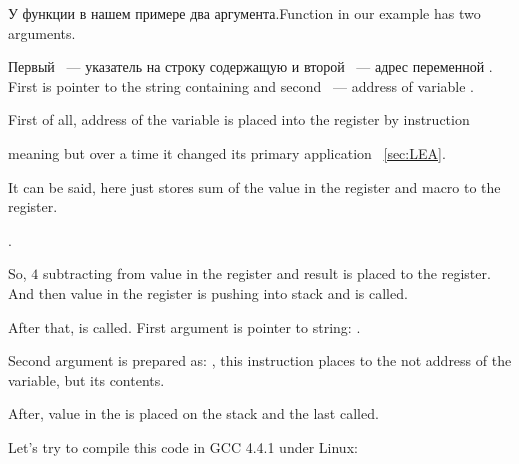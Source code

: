 \IFRU
{У функции \scanf в нашем примере два аргумента.}{Function \scanf in our example has two arguments.}

\IFRU
{Первый ~--- указатель на строку содержащую  и второй ~--- адрес переменной .} 
{First is pointer to the string containing  and second ~--- address of variable .} 

{First of all, address of the  variable is placed into the \EAX register by  instruction}

{\LEA meaning  but over a time it changed its primary application}
~\ref{sec:LEA}.

{It can be said, \LEA here just stores sum of the value in the \EBP register and  macro to the \EAX register.}

 .

{So, $4$ subtracting from value in the \EBP register and result is placed to the \EAX register.
And then value in the \EAX register is pushing into stack and \scanf is called.}

{After that, \printf is called. First argument is pointer to string:} .

{Second argument is prepared as: ,
this instruction places to the \ECX not address of the  variable, but its contents.}

{After, value in the \ECX is placed on the stack and the last \printf called.}

{Let's try to compile this code in GCC 4.4.1 under Linux:}

